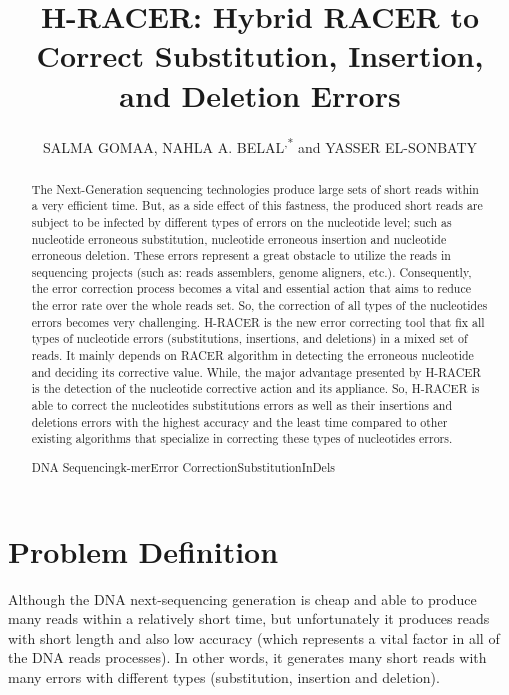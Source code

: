 \documentclass{llncs}
\begin{document}
\title{H-RACER: Hybrid RACER to Correct Substitution, Insertion, and Deletion Errors}

\author{SALMA GOMAA\fnmsep{}, NAHLA A. BELAL\fnmsep{}\textsuperscript{,*} and YASSER EL-SONBATY\fnmsep{}}



%
\begin{abstract}
The Next-Generation sequencing technologies produce large sets of short reads within a very efficient time. But, as a side effect of this fastness, the produced short reads are subject to be infected by different types of errors on the nucleotide level; such as nucleotide erroneous substitution, nucleotide erroneous insertion and nucleotide erroneous deletion. These errors represent a great obstacle to utilize the reads in sequencing projects (such as: reads assemblers, genome aligners, etc.). Consequently, the error correction process becomes a vital and essential action that aims to reduce the error rate over the whole reads set. So, the correction of all types of the nucleotides errors becomes very challenging. H-RACER is the new error correcting tool that fix all types of nucleotide errors (substitutions, insertions, and deletions) in a mixed set of reads. It mainly depends on RACER algorithm in detecting the erroneous nucleotide and deciding its corrective value. While, the major advantage presented by H-RACER is the detection of the nucleotide corrective action and its appliance. So, H-RACER is able to correct the nucleotides substitutions errors as well as their insertions and deletions errors with the highest accuracy and the least time compared to other existing algorithms that specialize in correcting these types of nucleotides errors.

\begin{keywords} 
DNA Sequencing\textperiodcentered k-mer\textperiodcentered Error Correction\textperiodcentered Substitution\textperiodcentered InDels
\end{keywords}
\end{abstract}
%
\section{Problem Definition}
Although the DNA next-sequencing generation is cheap and able to produce many reads within a relatively short time, but unfortunately it produces reads with short length and also low accuracy (which represents a vital factor in all of the DNA reads processes). In other words, it generates many short reads with many errors with different types (substitution, insertion and deletion).
%
\end{document}
